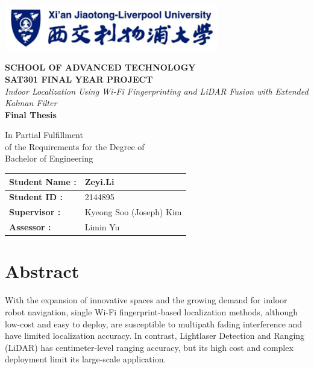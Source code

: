 \documentclass[12pt,a4paper]{article}
\numberwithin{equation}{section}
\begin{document}
\onehalfspacing  %

\begin{titlepage}
    \centering
    \vspace*{-1cm}
    \includegraphics[width=0.7\textwidth]{images/xjtlu.png}
 \vspace{1cm}

    {\large \textbf{SCHOOL OF ADVANCED TECHNOLOGY}}\\[0.3cm]
    {\large \textbf{SAT301 FINAL YEAR PROJECT}}\\[3cm]
    {\Large \textit{Indoor Localization Using Wi-Fi Fingerprinting and LiDAR Fusion with Extended Kalman Filter}}\\[2cm]
    {\LARGE \textbf{Final Thesis}}\\[4cm]

\begin{center}
\large
In Partial Fulfillment\\
of the Requirements for the Degree of\\
Bachelor of Engineering
\end{center}

\vfill
\begin{table}[H]
    \centering
    \begin{tabular}{|l|l|}
        \hline
        \textbf{Student Name :} & Zeyi.Li \\ \hline
        \textbf{Student ID :}   & 2144895 \\ \hline
        \textbf{Supervisor :}   & Kyeong Soo (Joseph) Kim \\ \hline
        \textbf{Assessor :}     & Limin Yu\\ \hline
    \end{tabular}
\end{table}
\end{titlepage}

\section*{Abstract}
With the expansion of innovative spaces and the growing demand for indoor robot navigation, single Wi-Fi fingerprint-based localization methods, although low-cost and easy to deploy, are susceptible to multipath fading interference and have limited localization accuracy. In contrast, Lightlaser Detection and Ranging (LiDAR) has centimeter-level ranging accuracy, but its high cost and complex deployment limit its large-scale application.
\end{document}
